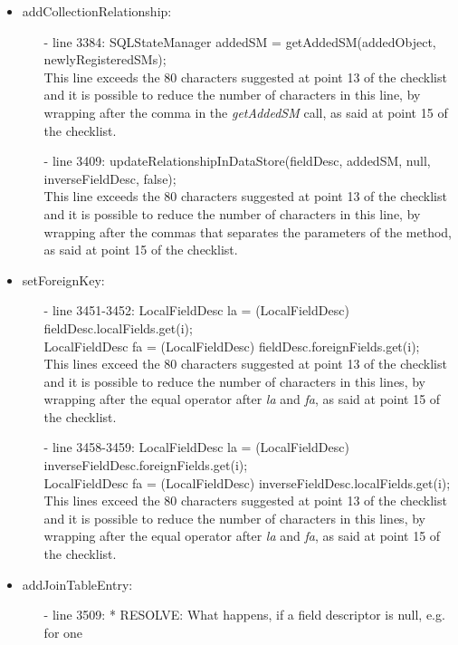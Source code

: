\documentclass[18pt,oneside,a4paper, titlepage]{article}
\begin{document}
\begin{itemize}
\begin{itemize}
				
			\end{itemize}
		\item addCollectionRelationship:
			\begin{itemize}
				\item[-] line 3384:  SQLStateManager addedSM = getAddedSM(addedObject, newlyRegisteredSMs);\\
				This line exceeds the 80 characters suggested at point 13 of the checklist and it is possible to reduce the number of characters in this line, by wrapping after the comma in the \textit{getAddedSM} call, as said at point 15 of the checklist.
				\item[-] line 3409: updateRelationshipInDataStore(fieldDesc, addedSM, null, inverseFieldDesc, false);\\
				This line exceeds the 80 characters suggested at point 13 of the checklist and it is possible to reduce the number of characters in this line, by wrapping after the commas that separates the parameters of the method, as said at point 15 of the checklist.
			\end{itemize}
		\item setForeignKey:
			\begin{itemize}
				\item[-] line 3451-3452: LocalFieldDesc la = (LocalFieldDesc) fieldDesc.localFields.get(i);\\
				LocalFieldDesc fa = (LocalFieldDesc) fieldDesc.foreignFields.get(i);\\
				This lines exceed the 80 characters suggested at point 13 of the checklist and it is possible to reduce the number of characters in this lines, by wrapping after the equal operator after \textit{la} and \textit{fa}, as said at point 15 of the checklist.
				\item[-] line 3458-3459: LocalFieldDesc la = (LocalFieldDesc) inverseFieldDesc.foreignFields.get(i);\\
				LocalFieldDesc fa = (LocalFieldDesc) inverseFieldDesc.localFields.get(i);\\
				This lines exceed the 80 characters suggested at point 13 of the checklist and it is possible to reduce the number of characters in this lines, by wrapping after the equal operator after \textit{la} and \textit{fa}, as said at point 15 of the checklist.
			\end{itemize}
		\item addJoinTableEntry:
		\begin{itemize}
			\item[-] line 3509: * RESOLVE: What happens, if a field descriptor is null, e.g. for one\\

\end{itemize}
\end{itemize}
\end{document}
